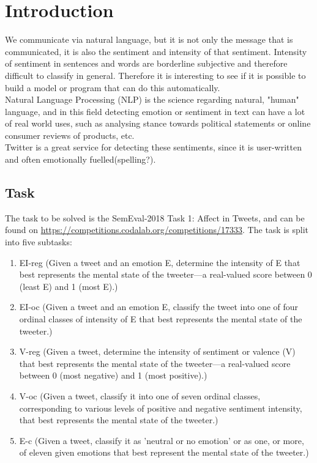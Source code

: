 \section{Introduction}
We communicate via natural language, but it is not only the message that is communicated, it is also the sentiment and intensity of that sentiment. Intensity of sentiment in sentences and words are borderline subjective and therefore difficult to classify in general. Therefore it is interesting to see if it is possible to build a model or program that can do this automatically. \\
Natural Language Processing (NLP) is the science regarding natural, "human" language, and in this field detecting emotion or sentiment in text can have a lot of real world uses, such as analysing stance towards political statements or online consumer reviews of products, etc. \\
Twitter is a great service for detecting these sentiments, since it is user-written and often emotionally fuelled(spelling?).
\subsection{Task} \label{sec:task}
The task to be solved is the SemEval-2018 Task 1: Affect in Tweets, and can be found on \hyperref[https://competitions.codalab.org/competitions/17333]{https://competitions.codalab.org/competitions/17333}. The task is split into five subtasks:\\
\begin{enumerate}
\item EI-reg (Given a tweet and an emotion E, determine the  intensity of E that best represents the mental state of the tweeter—a real-valued score between 0 (least E) and 1 (most E).)
\item EI-oc (Given a tweet and an emotion E, classify the tweet into one of four ordinal classes of intensity of E that best represents the mental state of the tweeter.)
\item V-reg (Given a tweet, determine the intensity of sentiment or valence (V) that best represents the mental state of the tweeter—a real-valued score between 0 (most negative) and 1 (most positive).)
\item V-oc (Given a tweet, classify it into one of seven ordinal classes, corresponding to various levels of positive and negative sentiment intensity, that best represents the mental state of the tweeter.)
\item E-c (Given a tweet, classify it as 'neutral or no emotion' or as one, or more, of eleven given emotions that best represent the mental state of the tweeter.)
\end{enumerate}
 
